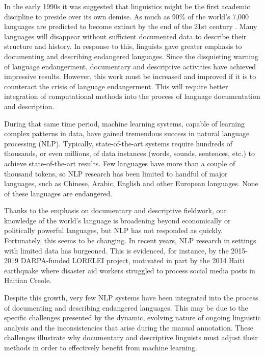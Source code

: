 In the early 1990s it was suggested that linguistics might be the first academic discipline to preside over its own demise. As much as 90\% of the world’s 7,000 languages are predicted to become extinct by the end of the 21st century \cite{krauss_worlds_1992,krauss_keynote--mass_2007,campbell_new_2013}. Many languages will disappear without sufficient documented data to describe their structure and history. In response to this, linguists gave greater emphasis to documenting and describing endangered languages. Since the disquieting warning of language endangerment, documentary and descriptive activities have achieved impressive results. However, this work 
must be increased and improved if it is to counteract the crisis of language endangerment. 
This will require better integration of computational methods into the process of language documentation and description. 

During that same time period, machine learning systems, capable of learning complex patterns in data, have gained tremendous success in natural language processing (NLP). Typically, state-of-the-art systems require hundreds of thousands, or even millions, of data instances (words, sounds, sentences, etc.) to achieve state-of-the-art results. Few languages have more than a couple of thousand tokens,
so NLP research has been limited to handful of major languages, such as Chinese, Arabic, English and other European languages. None of these languages 
are endangered.

Thanks to the emphasis on documentary and descriptive fieldwork, our knowledge of the world's language is broadening beyond economically or politically powerful languages, but NLP has not responded as quickly. Fortunately, this seems to be changing. In recent years, NLP research in settings with limited data has burgeoned. This is evidenced, for instance, by the 2015-2019 DARPA-funded LORELEI project, motivated in part by the 2014 Haiti earthquake where disaster aid workers struggled to process social media posts in Haitian Creole.

Despite this growth, very few NLP systems have been integrated into the process of documenting and describing endangered languages. This may be due to the specific challenges presented by the dynamic, evolving nature of ongoing linguistic analysis and the inconsistencies that arise during the manual annotation. These challenges illustrate why documentary and descriptive linguists must adjust their methods
in order to effectively benefit from machine learning.

